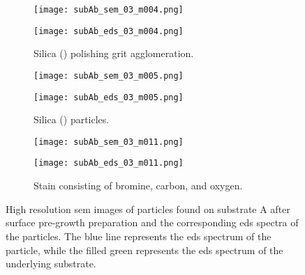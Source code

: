 \begin{figure}
    \centering
    \begin{subfigure}[t]{\textwidth}
          \begin{minipage}[t]{0.49\linewidth}
            \centering
            \texttt{[image: subAb\_sem\_03\_m004.png]}
          \end{minipage}
          \hfill
          \begin{minipage}[t]{0.49\linewidth}
            \centering
            \texttt{[image: subAb\_eds\_03\_m004.png]}
          \end{minipage}
        \caption{Silica () polishing grit agglomeration.}\label{fig:subAb_silica}
    \end{subfigure}
    \par\bigskip
    \begin{subfigure}[t]{\textwidth}
          \begin{minipage}[t]{0.49\linewidth}
            \centering
            \texttt{[image: subAb\_sem\_03\_m005.png]}
          \end{minipage}
          \hfill
          \begin{minipage}[t]{0.49\linewidth}
            \centering
            \texttt{[image: subAb\_eds\_03\_m005.png]}
          \end{minipage}
        \caption{Silica () particles.}\label{fig:subAb_silica2}
    \end{subfigure}
    \par\bigskip
    \begin{subfigure}[t]{\textwidth}
          \begin{minipage}[t]{0.49\linewidth}
            \centering
            \texttt{[image: subAb\_sem\_03\_m011.png]}
          \end{minipage}
          \hfill
          \begin{minipage}[t]{0.49\linewidth}
            \centering
            \texttt{[image: subAb\_eds\_03\_m011.png]}
          \end{minipage}
        \caption{Stain consisting of bromine, carbon, and oxygen.}\label{fig:subAb_br-stain}
    \end{subfigure}
    \caption[\Ac{sem} images and \ac{eds} spectra of particles found on substrate A after surface pre-growth preparation.]{High resolution \acf{sem} images of particles found on substrate A after surface pre-growth preparation and the corresponding \acf{eds} spectra of the particles. The blue line represents the \ac{eds} spectrum of the particle, while the filled green represents the \ac{eds} spectrum of the underlying substrate.}\label{fig:subAb_sem_w_eds}
\end{figure}

